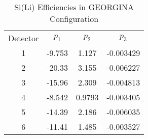 \begin{table}[]
    \centering
    \caption{Si(Li) Efficiencies in GEORGINA Configuration}
    \begin{tabular}{c|c|c|c}
    \toprule
        Detector & $p_1$ & $p_2$ & $p_3$ \\
        1	&	-9.753	&	1.127	&	-0.003429	\\
        2	&	-20.33	&	3.155	&	-0.006227	\\
        3	&	-15.96	&	2.309	&	-0.004813	\\
        4	&	-8.542	&	0.9793	&	-0.003405	\\
        5	&	-14.39	&	2.186	&	-0.006035	\\
        6	&	-11.41	&	1.485	&	-0.003527	\\
    \end{tabular}
    \label{tab:sili_eff_georgina}
\end{table}